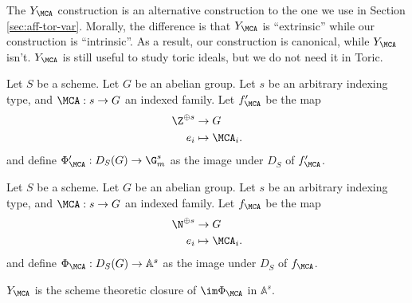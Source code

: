 The $Y_\MCA$ construction is an alternative construction to the one
we use in Section \ref{sec:aff-tor-var}.
Morally, the difference is that $Y_\MCA$ is ``extrinsic'' while our construction is ``intrinsic''.
As a result, our construction is canonical, while $Y_\MCA$ isn't.
$Y_\MCA$ is still useful to study toric ideals, but we do not need it in Toric.


\begin{definition}
  \label{1-1-phiAprime}

  Let $S$ be a scheme. Let $G$ be an abelian group.
  Let $s$ be an arbitrary indexing type, and $\MCA : s \to G$ an indexed family.
  Let $f'_\MCA$ be the map
  \begin{align*}
    \Z^{\oplus s} & \to G \\
    e_i & \mapsto \MCA_i.
  \end{align*}
  and define $\Phi'_\MCA : D_S(G) \to \G_m^s$ as the image under $D_S$ of $f'_\MCA$.
\end{definition}


\begin{definition}
  \label{1-1-phiA}

  Let $S$ be a scheme. Let $G$ be an abelian group.
  Let $s$ be an arbitrary indexing type, and $\MCA : s \to G$ an indexed family.
  Let $f_\MCA$ be the map
  \begin{align*}
    \N^{\oplus s} & \to G \\
    e_i & \mapsto \MCA_i.
  \end{align*}
  and define $\Phi_\MCA : D_S(G) \to \mathbb A^s$ as the image under $D_S$ of $f_\MCA$.
\end{definition}


\begin{definition}
  \label{1-1-7-ya}

  $Y_\MCA$ is the scheme theoretic closure of $\im \Phi_\MCA$ in $\mathbb A^s$.
\end{definition}



